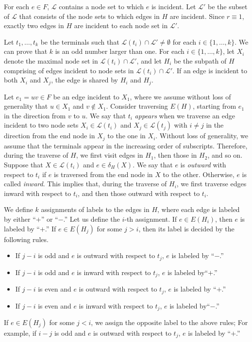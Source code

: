 \documentclass{article}
\newcommand{\Lfam}{\mathcal{L}}
\begin{document}
For each $e \in F$, $\Lfam$ contains a node set to which $e$ is
incident.
Let $\Lfam'$ be the subset of $\Lfam$ that consists of the node sets
to which edges in $H$ are incident.
Since $r \equiv 1$,
 exactly two edges in $H$ are incident to
each node set in $\Lfam'$.

Let $t_1,\ldots,t_k$ be the terminals such that $\Lfam(t_i) \cap \Lfam'
\neq \emptyset$ for each $i \in \{1,\ldots,k\}$.
We can prove that $k$ is an odd number larger than one.
For each $i \in \{1,\ldots,k\}$,
let $X_i$ denote the maximal node set in
$\Lfam(t_i) \cap \Lfam'$,
and let $H_i$ be the subpath of $H$ comprising of edges incident to node
sets in $\Lfam(t_i) \cap \Lfam'$.
If an edge is incident to both $X_i$ and $X_j$, the edge is
shared by $H_i$ and $H_j$.

Let $e_1=uv \in F$ be an edge incident to $X_1$, where we assume without loss
of generality that $u \in X_1$ and  $v \not\in X_1$.
Consider traversing $E(H)$, starting from $e_1$ in the direction from
$v$ to $u$. 
We say that $t_i$ \emph{appears} when
we traverse an edge incident to two node sets $X_i \in \Lfam(t_i)$ and $X_j
\in \Lfam(t_j)$ with $i\neq j$ in the direction from the end node in
$X_j$ to the one in $X_i$.
Without loss of generality, we assume that the terminals appear in the increasing order
of subscripts.
Therefore, during the traverse of $H$, we first visit edges in $H_1$,
then those in $H_2$, and so on.
Suppose that $X\in \Lfam(t_i)$ and $e \in \delta_H(X)$.
We say that $e$ is \emph{outward} with respect to $t_i$ if $e$ is
traversed from the end node in $X$ to the other.
Otherwise, $e$ is called \emph{inward}.
This implies that, during the traverse of $H_i$,
we first traverse edges inward with respect to $t_i$, and then those
outward with respect to $t_i$.

We define $k$ assignments of labels to the edges in $H$, 
where each edge is labeled by either ``$+$'' or ``$-$.''
Let us define the $i$-th assignment.
If $e \in E(H_i)$, then $e$ is labeled by ``$+$.'' If $e \in E(H_j)$ for
some $j > i$, then its label is decided by the following rules.
\begin{itemize}
\item If $j-i$ is odd and $e$ is outward with respect to $t_j$,
$e$ is labeled by ``$-$.''
\item If $j-i$ is odd and $e$ is inward with respect to $t_j$,
$e$ is labeled by``$+$.''
\item If $j-i$ is even and $e$ is outward with respect to $t_j$,
$e$ is labeled by ``$+$.''
\item If $j-i$ is even and $e$ is inward with respect to $t_j$, 
$e$ is labeled by``$-$.''
\end{itemize}
If $e \in E(H_j)$ for some $j < i$, we assign the opposite label to the
above rules; For example, if
$i-j$ is odd and $e$ is outward with respect to $t_j$,
$e$ is labeled by ``$+$.''
\end{document}
